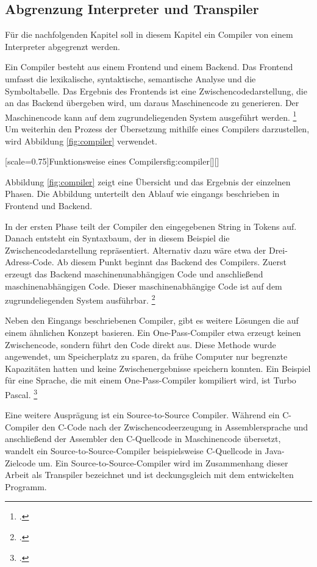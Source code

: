 \subsection{Abgrenzung Interpreter und Transpiler}
Für die nachfolgenden Kapitel soll in diesem Kapitel ein Compiler von einem Interpreter abgegrenzt werden.
  
Ein Compiler besteht aus einem Frontend und einem Backend. Das Frontend umfasst die lexikalische, syntaktische, semantische Analyse und die Symboltabelle.
Das Ergebnis des Frontends ist eine Zwischencodedarstellung, die an das Backend übergeben wird, um daraus Maschinencode zu generieren. Der Maschinencode kann auf dem zugrundeliegenden System ausgeführt werden. \footcite[Vgl. ][S.106ff. ]{aho}
Um weiterhin den Prozess der Übersetzung mithilfe eines Compilers darzustellen, wird Abbildung \ref{fig:compiler} verwendet.

\pagebreak
[scale=0.75]{Funktionsweise eines Compilers}{fig:compiler}[][]

\pagebreak
Abbildung \ref{fig:compiler} zeigt eine Übersicht und das Ergebnis der einzelnen Phasen. Die Abbildung unterteilt den Ablauf wie eingangs beschrieben in Frontend und Backend.

In der ersten Phase teilt der Compiler den eingegebenen String in Tokens auf. Danach entsteht ein Syntaxbaum, der in diesem Beispiel die Zwischencodedarstellung repräsentiert. Alternativ dazu wäre etwa der Drei-Adress-Code. Ab diesem Punkt beginnt das Backend des Compilers. Zuerst erzeugt das Backend maschinenunabhängigen Code und anschließend maschinenabhängigen Code. Dieser maschinenabhängige Code ist auf dem zugrundeliegenden System ausführbar. \footcite[Vgl. ][S.30 ]{aho}

Neben den Eingangs beschriebenen Compiler, gibt es weitere Lösungen die auf einem ähnlichen Konzept basieren.
Ein One-Pass-Compiler etwa erzeugt keinen Zwischencode, sondern führt den Code direkt aus. Diese Methode wurde angewendet, um Speicherplatz zu sparen, da frühe Computer nur begrenzte Kapazitäten hatten und keine Zwischenergebnisse speichern konnten. Ein Beispiel für eine Sprache, die mit einem One-Pass-Compiler kompiliert wird, ist Turbo Pascal. \footcite[Vgl. ][]{onepass}

Eine weitere Ausprägung ist ein Source-to-Source Compiler.
Während ein C-Compiler den C-Code nach der Zwischencodeerzeugung in Assemblersprache und anschließend der Assembler den C-Quellcode in Maschinencode übersetzt, wandelt ein Source-to-Source-Compiler beispielsweise C-Quellcode in Java-Zielcode um. 
Ein Source-to-Source-Compiler wird im Zusammenhang dieser Arbeit als Transpiler bezeichnet und ist deckungsgleich mit dem entwickelten Programm.

